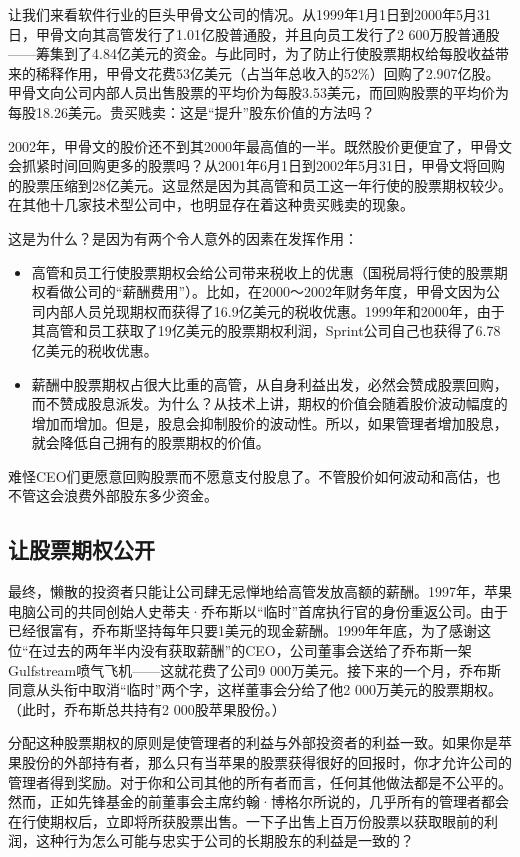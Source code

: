 \documentclass[12pt,oneside]{book}
\begin{document}
让我们来看软件行业的巨头甲骨文公司的情况。从1999年1月1日到2000年5月31日，甲骨文向其高管发行了1.01亿股普通股，并且向员工发行了2 600万股普通股——筹集到了4.84亿美元的资金。与此同时，为了防止行使股票期权给每股收益带来的稀释作用，甲骨文花费53亿美元（占当年总收入的52\%）回购了2.907亿股。甲骨文向公司内部人员出售股票的平均价为每股3.53美元，而回购股票的平均价为每股18.26美元。贵买贱卖：这是“提升”股东价值的方法吗？

2002年，甲骨文的股价还不到其2000年最高值的一半。既然股价更便宜了，甲骨文会抓紧时间回购更多的股票吗？从2001年6月1日到2002年5月31日，甲骨文将回购的股票压缩到28亿美元。这显然是因为其高管和员工这一年行使的股票期权较少。在其他十几家技术型公司中，也明显存在着这种贵买贱卖的现象。

这是为什么？是因为有两个令人意外的因素在发挥作用：

\begin{itemize}
\item 高管和员工行使股票期权会给公司带来税收上的优惠（国税局将行使的股票期权看做公司的“薪酬费用”）。比如，在2000～2002年财务年度，甲骨文因为公司内部人员兑现期权而获得了16.9亿美元的税收优惠。1999年和2000年，由于其高管和员工获取了19亿美元的股票期权利润，Sprint公司自己也获得了6.78亿美元的税收优惠。
\item 薪酬中股票期权占很大比重的高管，从自身利益出发，必然会赞成股票回购，而不赞成股息派发。为什么？从技术上讲，期权的价值会随着股价波动幅度的增加而增加。但是，股息会抑制股价的波动性。所以，如果管理者增加股息，就会降低自己拥有的股票期权的价值。
\end{itemize}

难怪CEO们更愿意回购股票而不愿意支付股息了。不管股价如何波动和高估，也不管这会浪费外部股东多少资金。

\subsection{让股票期权公开}
最终，懒散的投资者只能让公司肆无忌惮地给高管发放高额的薪酬。1997年，苹果电脑公司的共同创始人史蒂夫·乔布斯以“临时”首席执行官的身份重返公司。由于已经很富有，乔布斯坚持每年只要1美元的现金薪酬。1999年年底，为了感谢这位“在过去的两年半内没有获取薪酬”的CEO，公司董事会送给了乔布斯一架Gulfstream喷气飞机——这就花费了公司9 000万美元。接下来的一个月，乔布斯同意从头衔中取消“临时”两个字，这样董事会分给了他2 000万美元的股票期权。（此时，乔布斯总共持有2 000股苹果股份。）

分配这种股票期权的原则是使管理者的利益与外部投资者的利益一致。如果你是苹果股份的外部持有者，那么只有当苹果的股票获得很好的回报时，你才允许公司的管理者得到奖励。对于你和公司其他的所有者而言，任何其他做法都是不公平的。然而，正如先锋基金的前董事会主席约翰·博格尔所说的，几乎所有的管理者都会在行使期权后，立即将所获股票出售。一下子出售上百万份股票以获取眼前的利润，这种行为怎么可能与忠实于公司的长期股东的利益是一致的？
\end{document}
